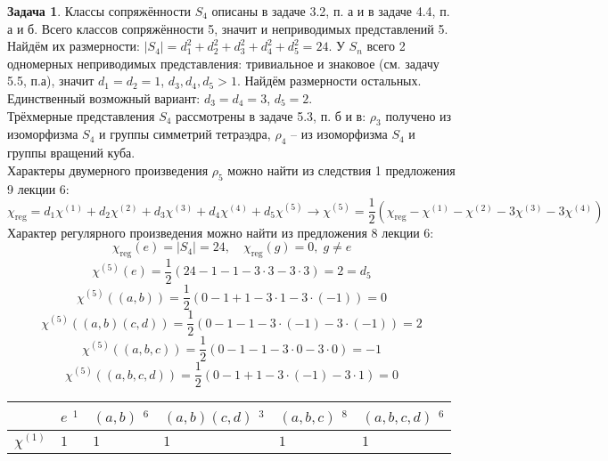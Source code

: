 \documentclass[12pt]{article}
\theoremstyle{definition}
\newtheorem{zad}{Задача}[section]
\begin{document}
\begin{zad}
Классы сопряжённости $S_4$ описаны в задаче 3.2, п. а и в задаче 4.4, п. а и б. Всего классов сопряжённости 5, значит и неприводимых представлений 5. Найдём их размерности: $|S_4|=d_1^2+d_2^2+d_3^2+d_4^2+d_5^2=24$. У $S_n$ всего 2 одномерных неприводимых представления: тривиальное и знаковое (см. задачу 5.5, п.а), значит $d_1=d_2=1$, $d_3,d_4,d_5>1$. Найдём размерности остальных. Единственный возможный вариант: $d_3=d_4=3$, $d_5=2$.\\
Трёхмерные представления $S_4$ рассмотрены в задаче 5.3, п. б и в: $\rho_3$ получено из изоморфизма $S_4$ и группы симметрий тетраэдра, $\rho_4$ -- из изоморфизма $S_4$ и группы вращений куба.\\
Характеры двумерного произведения $\rho_5$ можно найти из следствия 1 предложения 9 лекции 6:
\begin{equation}
    \chi_\text{reg}=d_1\chi^{(1)}+d_2\chi^{(2)}+d_3\chi^{(3)}+d_4\chi^{(4)}+d_5\chi^{(5)}\rightarrow \chi^{(5)}=\frac{1}{2}(\chi_\text{reg}-\chi^{(1)}-\chi^{(2)}-3\chi^{(3)}-3\chi^{(4)})
\end{equation}
Характер регулярного произведения можно найти из предложения 8 лекции 6:
\begin{equation}
    \chi_\text{reg}(e)=|S_4|=24, \quad \chi_\text{reg}(g)=0, \; g\neq e
\end{equation}
\begin{equation}
    \chi^{(5)}(e)=\frac{1}{2}(24-1-1-3\cdot 3-3\cdot 3)=2=d_5
\end{equation}
\begin{equation}
    \chi^{(5)}((a,b))=\frac{1}{2}(0-1+1-3\cdot 1-3\cdot (-1))=0
\end{equation}
\begin{equation}
    \chi^{(5)}((a,b)(c,d))=\frac{1}{2}(0-1-1-3\cdot (-1)-3\cdot (-1))=2
\end{equation}
\begin{equation}
    \chi^{(5)}((a,b,c))=\frac{1}{2}(0-1-1-3\cdot 0-3\cdot 0)=-1
\end{equation}
\begin{equation}
    \chi^{(5)}((a,b,c,d))=\frac{1}{2}(0-1+1-3\cdot(-1)-3\cdot 1)=0
\end{equation}
\begin{table}[h!]
\centering
\begin{tabular}{|l|l|l|l|l|l|}
\hline
 & $e$ $^1$ & $(a,b)$ $^6$ & $(a,b)(c,d)$ $^3$ & $(a,b,c)$ $^8$ & $(a,b,c,d)$ $^6$ \\ \hline
$\chi^{(1)}$ & $1$ & $1$ & $1$ & $1$ & $1$ \\ \hline

\end{tabular}
\end{table}
\end{zad}
\end{document}
